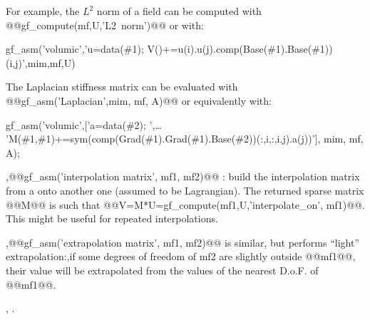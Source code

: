 \begin{cmddescription}
  For example, the $L^2$ norm of a field can be computed with
  @@gf_compute(mf,U,'L2~norm')@@ or with:
  \begin{mcode}
gf_asm('volumic','u=data(\#1); V()+=u(i).u(j).comp(Base(\#1).Base(\#1))(i,j)',mim,mf,U)
  \end{mcode}

  The Laplacian stiffness matrix can be evaluated with @@gf_asm('Laplacian',mim, mf, A)@@ or equivalently with:
  \begin{mcode}
gf_asm('volumic',['a=data(\#2); ',\ldots
       'M(\#1,\#1)+=sym(comp(Grad(\#1).Grad(\#1).Base(\#2))(:,i,:,i,j).a(j))'], mim, mf, A);
  \end{mcode}
  
  \sep{@@gf_asm('interpolation matrix', mf1, mf2)@@} : build the interpolation matrix
  from a \tmf onto another one (assumed to be Lagrangian). The returned sparse
  matrix @@M@@ is such that @@V=M*U=gf\_compute(mf1,U,'interpolate_on', mf1)@@.
  This might be useful for repeated interpolations.
  
  \sep{@@gf_asm('extrapolation matrix', mf1, mf2)@@} is similar, but performs
  ``light'' extrapolation:,if some degrees of freedom of mf2 are slightly
  outside @@mf1@@, their value will be extrapolated from the values of the
  nearest D.o.F. of @@mf1@@.


\end{cmddescription}
\begin{gfseealso}
  , .
\end{gfseealso}
\newpage



